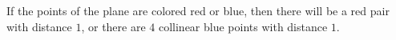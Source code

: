 If the points of the plane are colored red or blue, then there will be a red pair with distance $1$, or there are $4$ collinear blue points with distance $1$.
